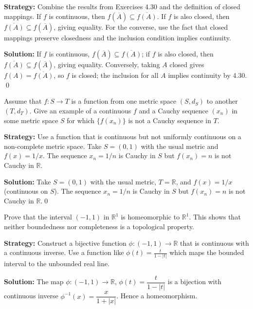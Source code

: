 \noindent\textbf{Strategy:} Combine the results from Exercises 4.30 and the definition of closed mappings. If $f$ is continuous, then $f(\overline{A}) \subseteq \overline{f(A)}$. If $f$ is also closed, then $\overline{f(A)} \subseteq f(\overline{A})$, giving equality. For the converse, use the fact that closed mappings preserve closedness and the inclusion condition implies continuity.

\bigskip\noindent\textbf{Solution:}
If $f$ is continuous, $f(\overline{A})\subseteq\overline{f(A)}$; if $f$ is also closed, then $\overline{f(A)}\subseteq f(\overline{A})$, giving equality. Conversely, taking $A$ closed gives $f(A)=\overline{f(A)}$, so $f$ is closed; the inclusion for all $A$ implies continuity by 4.30. \qed



\begin{problembox}
Assume that $f : S \rightarrow T$ is a function from one metric space $(S, d_S)$ to another $(T, d_T)$. Give an example of a continuous $f$ and a Cauchy sequence $(x_n)$ in some metric space $S$ for which $\{f(x_n)\}$ is not a Cauchy sequence in $T$.
\end{problembox}

\noindent\textbf{Strategy:} Use a function that is continuous but not uniformly continuous on a non-complete metric space. Take $S = (0,1)$ with the usual metric and $f(x) = 1/x$. The sequence $x_n = 1/n$ is Cauchy in $S$ but $f(x_n) = n$ is not Cauchy in $\mathbb{R}$.

\bigskip\noindent\textbf{Solution:}
Take $S=(0,1)$ with the usual metric, $T=\mathbb{R}$, and $f(x)=1/x$ (continuous on $S$). The sequence $x_n=1/n$ is Cauchy in $S$ but $f(x_n)=n$ is not Cauchy in $\mathbb{R}$.\qed



\begin{problembox}
Prove that the interval $(-1, 1)$ in $\mathbb{R}^1$ is homeomorphic to $\mathbb{R}^1$. This shows that neither boundedness nor completeness is a topological property.
\end{problembox}

\noindent\textbf{Strategy:} Construct a bijective function $\phi: (-1,1) \to \mathbb{R}$ that is continuous with a continuous inverse. Use a function like $\phi(t) = \frac{t}{1-|t|}$ which maps the bounded interval to the unbounded real line.

\bigskip\noindent\textbf{Solution:}
The map $\phi:(-1,1)\to\mathbb{R}$, $\phi(t)=\dfrac{t}{1-|t|}$ is a bijection with continuous inverse $\phi^{-1}(x)=\dfrac{x}{1+|x|}$. Hence a homeomorphism.

